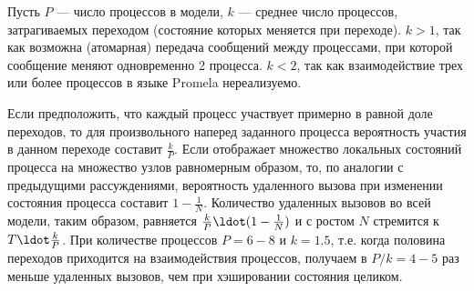 Пусть $P$ — число процессов в модели, $k$ — среднее число процессов,
затрагиваемых переходом (состояние которых меняется при переходе). $k
> 1$, так как возможна (атомарная) передача сообщений между
процессами, при которой сообщение меняют одновременно 2 процесса. $k <
2$, так как взаимодействие трех или более процессов в языке Promela
нереализуемо.

Если предположить, что каждый процесс участвует примерно в равной доле
переходов, то для произвольного наперед заданного процесса вероятность
участия в данном переходе составит $\frac{k}{P}$. Если
 отображает множество локальных состояний процесса на
множество узлов равномерным образом, то, по аналогии с предыдущими
рассуждениями, вероятность удаленного вызова при изменении состояния
процесса составит $1 - \frac{1}{N}$. Количество удаленных вызовов во
всей модели, таким образом, равняется $\frac{k}{P} \ldot (1 -
\frac{1}{N})$ и с ростом $N$ стремится к $T \ldot \frac{k}{P}$. При
количестве процессов $P = 6-8$ и $k = 1.5$, т.е. когда половина переходов
приходится на взаимодействия процессов, получаем в $P/k = 4-5$ раз
меньше удаленных вызовов, чем при хэшировании состояния целиком.

